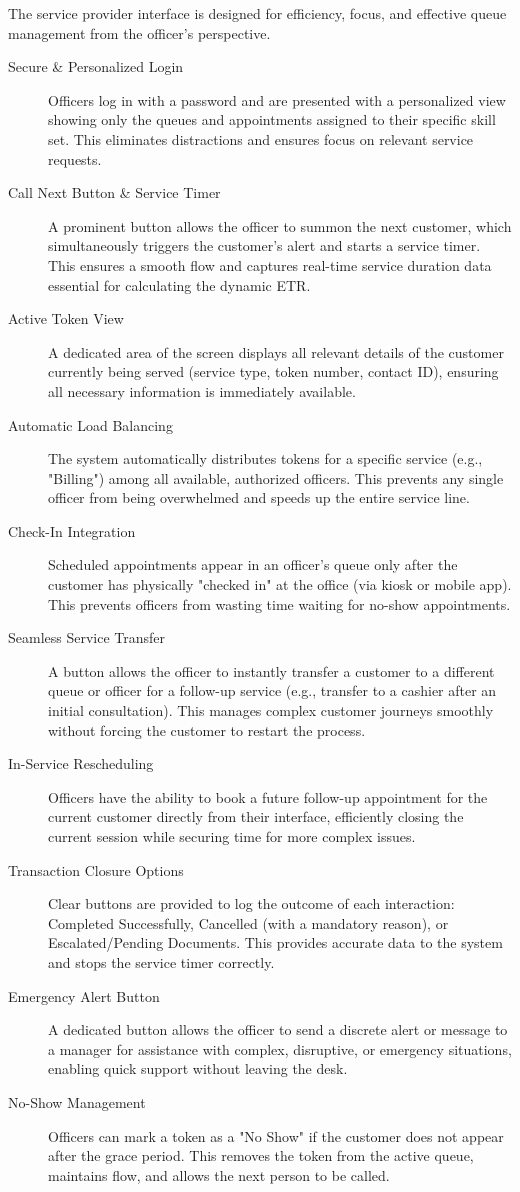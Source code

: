 \documentclass[12pt,a4paper]{report}
\begin{document}
The service provider interface is designed for efficiency, focus, and effective queue management from the officer's perspective.

\begin{description}
    \item[Secure \& Personalized Login] Officers log in with a password and are presented with a personalized view showing only the queues and appointments assigned to their specific skill set. This eliminates distractions and ensures focus on relevant service requests.
    \item[Call Next Button \& Service Timer] A prominent button allows the officer to summon the next customer, which simultaneously triggers the customer's alert and starts a service timer. This ensures a smooth flow and captures real-time service duration data essential for calculating the dynamic ETR.
    \item[Active Token View] A dedicated area of the screen displays all relevant details of the customer currently being served (service type, token number, contact ID), ensuring all necessary information is immediately available.
    \item[Automatic Load Balancing] The system automatically distributes tokens for a specific service (e.g., "Billing") among all available, authorized officers. This prevents any single officer from being overwhelmed and speeds up the entire service line.
    \item[Check-In Integration] Scheduled appointments appear in an officer's queue only after the customer has physically "checked in" at the office (via kiosk or mobile app). This prevents officers from wasting time waiting for no-show appointments.
    \item[Seamless Service Transfer] A button allows the officer to instantly transfer a customer to a different queue or officer for a follow-up service (e.g., transfer to a cashier after an initial consultation). This manages complex customer journeys smoothly without forcing the customer to restart the process.
    \item[In-Service Rescheduling] Officers have the ability to book a future follow-up appointment for the current customer directly from their interface, efficiently closing the current session while securing time for more complex issues.
    \item[Transaction Closure Options] Clear buttons are provided to log the outcome of each interaction: Completed Successfully, Cancelled (with a mandatory reason), or Escalated/Pending Documents. This provides accurate data to the system and stops the service timer correctly.
    \item[Emergency Alert Button] A dedicated button allows the officer to send a discrete alert or message to a manager for assistance with complex, disruptive, or emergency situations, enabling quick support without leaving the desk.
    \item[No-Show Management] Officers can mark a token as a "No Show" if the customer does not appear after the grace period. This removes the token from the active queue, maintains flow, and allows the next person to be called.
\end{description}
\end{document}
